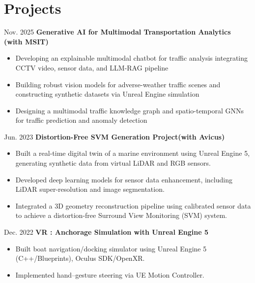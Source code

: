 \documentclass[10pt, letterpaper]{article}
\newenvironment{highlights}{
    \begin{itemize}[
        topsep=0.10 cm,
        parsep=0.10 cm,
        partopsep=0pt,
        itemsep=0pt,
        leftmargin=0.4 cm + 10pt
    ]
}{
    \end{itemize}
} %
\newenvironment{twocolentry_project}[2][]{
    \onecolentry
    \def\secondColumn{#2}
    \setcolumnwidth{\fill, 2.0 cm}
    \begin{paracol}{2}
}{
    \switchcolumn \raggedleft \secondColumn
    \end{paracol}
    \endonecolentry
} %
\begin{document}
    \vspace{0.2 cm}

    \section{Projects}


    \begin{twocolentry_project}{
        Nov. 2025
    }
        \textbf{Generative AI for Multimodal Transportation Analytics (with MSIT)}
        \begin{highlights}
            \item Developing an explainable multimodal chatbot for traffic analysis integrating CCTV video, sensor data, and LLM-RAG pipeline
            \item Building robust vision models for adverse-weather traffic scenes and constructing synthetic datasets via Unreal Engine simulation
            \item Designing a multimodal traffic knowledge graph and spatio-temporal GNNs for traffic prediction and anomaly detection
        \end{highlights}
    \end{twocolentry_project}

    \vspace{0.2 cm}


    \begin{twocolentry_project}{
        Jun. 2023
    }
        \textbf{Distortion-Free SVM Generation Project(with Avicus)}
        \begin{highlights}
            \item Built a real-time digital twin of a marine environment using Unreal Engine 5, generating synthetic data from virtual LiDAR and RGB sensors.
            \item Developed deep learning models for sensor data enhancement, including LiDAR super-resolution and image segmentation.
            \item Integrated a 3D geometry reconstruction pipeline using calibrated sensor data to achieve a distortion-free Surround View Monitoring (SVM) system.
        \end{highlights}
    \end{twocolentry_project}

    \vspace{0.2 cm}
    \begin{twocolentry_project}{Dec. 2022}
        \textbf{VR : Anchorage Simulation with Unreal Engine 5}
        \begin{highlights}
            \item Built boat navigation/docking simulator using Unreal Engine 5 (C++/Blueprints), Oculus SDK/OpenXR.
            \item Implemented hand–gesture steering via UE Motion Controller.
        \end{highlights}
    \end{twocolentry_project}
    
\end{document}
